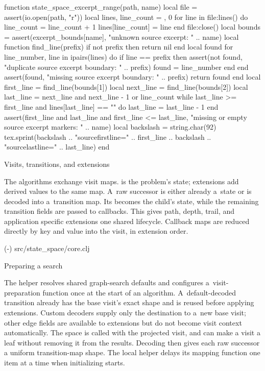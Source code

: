 {{  function state_space_excerpt_range(path, name)
    local file = assert(io.open(path, "r"))
    local lines, line_count = {}, 0
    for line in file:lines() do
      line_count = line_count + 1
      lines[line_count] = line
    end
    file:close()
    local bounds = assert(excerpt_bounds[name],
                         "unknown source excerpt: " .. name)
    local function find_line(prefix)
      if not prefix then return nil end
      local found
      for line_number, line in ipairs(lines) do
        if line == prefix then
          assert(not found, "duplicate source excerpt boundary: " .. prefix)
          found = line_number
        end
      end
      assert(found, "missing source excerpt boundary: " .. prefix)
      return found
    end
    local first_line = find_line(bounds[1])
    local next_line = find_line(bounds[2])
    local last_line = next_line and next_line - 1 or line_count
    while last_line >= first_line and lines[last_line] == "" do
      last_line = last_line - 1
    end
    assert(first_line and last_line and first_line <= last_line,
           "missing or empty source excerpt markers: " .. name)
    local backslash = string.char(92)
    tex.sprint(backslash .. "sourcefirstline=" .. first_line ..
               backslash .. "sourcelastline=" .. last_line)
  end
}

\load[doc]
\hyperlinks \Blue \Green
\def\bgverbcolor{\setcmykcolor{0 0 .12 0}}

\secc Visits, transitions, and extensions

The algorithms exchange visit maps.  is the problem's state;
extensions add derived values to the same map. A~raw successor is either
already a~state or is decoded into a~transition map. Its 
becomes the child's state, while the remaining transition fields are passed
to  callbacks. This gives path, depth, trail, and application
specific extensions one shared lifecycle.
Callback maps are reduced directly by key and value into the visit, in
extension order.

\begingroup
\typosize[8/9]
\verbinput {} (\the\sourcefirstline-\the\sourcelastline) src/state_space/core.clj
\endgroup

\secc Preparing a search

The  helper resolves shared graph-search defaults and
configures a~visit-preparation function once at the start of an algorithm.
A~default-decoded transition already has the base visit's exact shape and
is reused before applying extensions. Custom decoders supply only the
destination to a~new base visit; other edge fields are available to
extensions but do not become visit context automatically.
The space is called
with the projected visit, and  can make a visit a leaf without
removing it from the results. Decoding then gives each raw successor a
uniform transition-map shape. The local  helper delays its
mapping function one item at a time when initializing starts.

}
